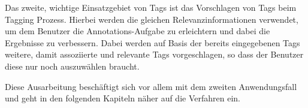 Das zweite, wichtige Einsatzgebiet von Tags ist das Vorschlagen von Tags beim Tagging Prozess. Hierbei werden die gleichen Relevanzinformationen verwendet, um dem Benutzer die Annotations-Aufgabe zu erleichtern und dabei die Ergebnisse zu verbessern. Dabei werden auf Basis der bereits eingegebenen Tags weitere, damit assoziierte und relevante Tags vorgeschlagen, so dass der Benutzer diese nur noch auszuwählen braucht.

Diese Ausarbeitung beschäftigt sich vor allem mit dem zweiten Anwendungsfall und geht in den folgenden Kapiteln näher auf die Verfahren ein.




% 
